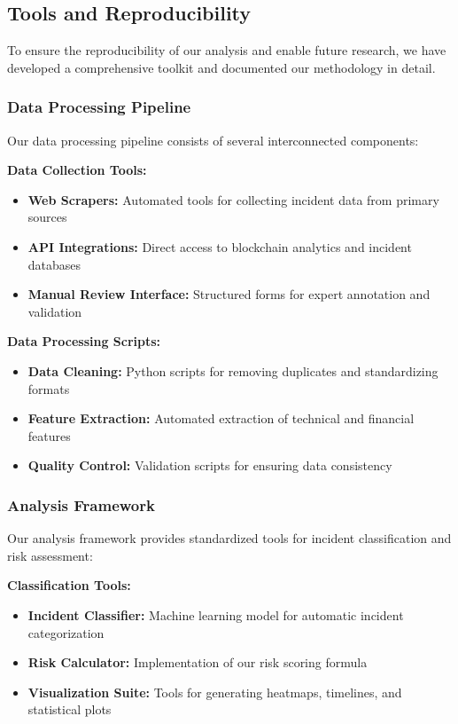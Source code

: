 \subsection{Tools and Reproducibility}
\label{sec:tools_and_reproducibility}

To ensure the reproducibility of our analysis and enable future research, we have developed a comprehensive toolkit and documented our methodology in detail.

\subsubsection{Data Processing Pipeline}
Our data processing pipeline consists of several interconnected components:

\textbf{Data Collection Tools:}
\begin{itemize}
    \item \textbf{Web Scrapers:} Automated tools for collecting incident data from primary sources
    \item \textbf{API Integrations:} Direct access to blockchain analytics and incident databases
    \item \textbf{Manual Review Interface:} Structured forms for expert annotation and validation
\end{itemize}

\textbf{Data Processing Scripts:}
\begin{itemize}
    \item \textbf{Data Cleaning:} Python scripts for removing duplicates and standardizing formats
    \item \textbf{Feature Extraction:} Automated extraction of technical and financial features
    \item \textbf{Quality Control:} Validation scripts for ensuring data consistency
\end{itemize}

\subsubsection{Analysis Framework}
Our analysis framework provides standardized tools for incident classification and risk assessment:

\textbf{Classification Tools:}
\begin{itemize}
    \item \textbf{Incident Classifier:} Machine learning model for automatic incident categorization
    \item \textbf{Risk Calculator:} Implementation of our risk scoring formula
    \item \textbf{Visualization Suite:} Tools for generating heatmaps, timelines, and statistical plots
\end{itemize}

